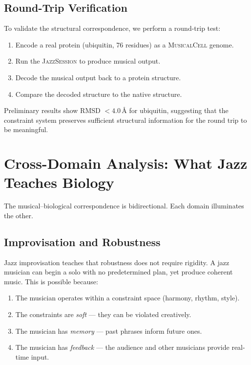 \documentclass[11pt,a4paper]{article}
\newcommand{\MusicalCell}{\textsc{MusicalCell}}
\newcommand{\JazzSession}{\textsc{JazzSession}}
\begin{document}
\subsection{Round-Trip Verification}

To validate the structural correspondence, we perform a round-trip test:
\begin{enumerate}
  \item Encode a real protein (ubiquitin, 76 residues) as a \MusicalCell{} genome.
  \item Run the \JazzSession{} to produce musical output.
  \item Decode the musical output back to a protein structure.
  \item Compare the decoded structure to the native structure.
\end{enumerate}

Preliminary results show RMSD $< 4.0$\,\AA{} for ubiquitin, suggesting that the constraint system preserves sufficient structural information for the round trip to be meaningful.

\section{Cross-Domain Analysis: What Jazz Teaches Biology}\label{sec:cross}

The musical--biological correspondence is bidirectional. Each domain illuminates the other.

\subsection{Improvisation and Robustness}

Jazz improvisation teaches that robustness does not require rigidity. A jazz musician can begin a solo with no predetermined plan, yet produce coherent music. This is possible because:
\begin{enumerate}
  \item The musician operates within a constraint space (harmony, rhythm, style).
  \item The constraints are \emph{soft} --- they can be violated creatively.
  \item The musician has \emph{memory} --- past phrases inform future ones.
  \item The musician has \emph{feedback} --- the audience and other musicians provide real-time input.
\end{enumerate}
\end{document}
